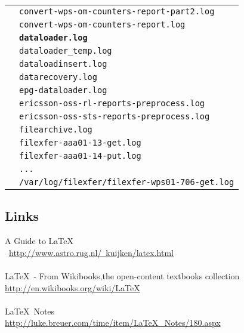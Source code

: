 \documentclass[12pt,letterpaper,dvips]{article}
\begin{document}
\begin{longtable}[l]{ll}
    &\texttt{convert-wps-om-counters-report-part2.log}\\
    &\texttt{convert-wps-om-counters-report.log}\\
    &\texttt{\textbf{dataloader.log}}\\
    &\texttt{dataloader\_temp.log}\\
    &\texttt{dataloadinsert.log}\\
    &\texttt{datarecovery.log}\\
    &\texttt{epg-dataloader.log}\\
    &\texttt{ericsson-oss-rl-reports-preprocess.log}\\
    &\texttt{ericsson-oss-sts-reports-preprocess.log}\\
    &\texttt{filearchive.log}\\
    &\texttt{filexfer-aaa01-13-get.log}\\
    &\texttt{filexfer-aaa01-14-put.log}\\
    &\texttt{...}\\
    &\texttt{/var/log/filexfer/filexfer-wps01-706-get.log}\\
    \hline \hline
\end{longtable}


\subsection{Links}
A Guide to \LaTeX\\\
\href{http://www.astro.rug.nl/~kuijken/latex.html}
{http://www.astro.rug.nl/~kuijken/latex.html}
\\
\\
\LaTeX\ - From Wikibooks,the open-content textbooks collection\\
\href{http://en.wikibooks.org/wiki/LaTeX}{http://en.wikibooks.org/wiki/LaTeX}
\\
\\
\LaTeX\ Notes\\
\href{http://luke.breuer.com/time/item/LaTeX\_Notes/180.aspx}{http://luke.breuer.com/time/item/LaTeX\_Notes/180.aspx}
\end{document}
